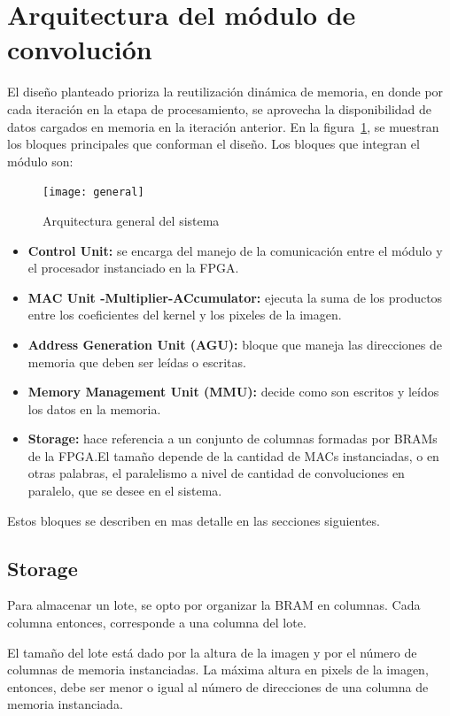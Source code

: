 \section{Arquitectura del módulo de convolución}  \label{ourdesign_subsecs}

El diseño planteado prioriza la reutilización dinámica de memoria, en donde por
cada iteración en la etapa de procesamiento, se aprovecha la disponibilidad de
datos cargados en memoria en la iteración anterior.
En la figura~\ref{general}, se muestran los bloques principales que conforman el
diseño. Los bloques que integran el módulo son:

\begin{figure}
\centering
\texttt{[image: general]}
\caption{Arquitectura general del sistema }
\label{general}
\end{figure}

\begin{itemize}
\item \textbf{Control Unit:} se encarga del manejo de la comunicación entre el
  módulo y el procesador instanciado en la FPGA.\@
\item \textbf{MAC Unit -Multiplier-ACcumulator:} ejecuta la suma de los productos entre los coeficientes del kernel y los pixeles de la imagen. 
\item \textbf{Address Generation Unit (AGU):} bloque que maneja las direcciones
  de memoria que deben ser leídas o escritas.
\item \textbf{Memory Management Unit (MMU):} decide como son escritos y leídos
  los datos en la memoria.
\item \textbf{Storage:} hace referencia a un conjunto de columnas formadas por
  BRAMs de la FPGA.\@ El tamaño depende de la cantidad de MACs instanciadas,
  o en otras palabras, el paralelismo a nivel de cantidad de convoluciones en
  paralelo, que se desee en el sistema.
\end{itemize}
     
Estos bloques se describen en mas detalle en las secciones siguientes.

\subsection{Storage}\label{storage_subsecc}

Para almacenar un lote, se opto por organizar la BRAM en
columnas. Cada columna entonces, corresponde a una columna del lote.

El tamaño del lote está dado por la altura de la imagen y por el número de
columnas de memoria instanciadas.  La máxima altura en pixels de la imagen,
entonces, debe ser menor o igual al número de direcciones de una columna de
memoria instanciada.

